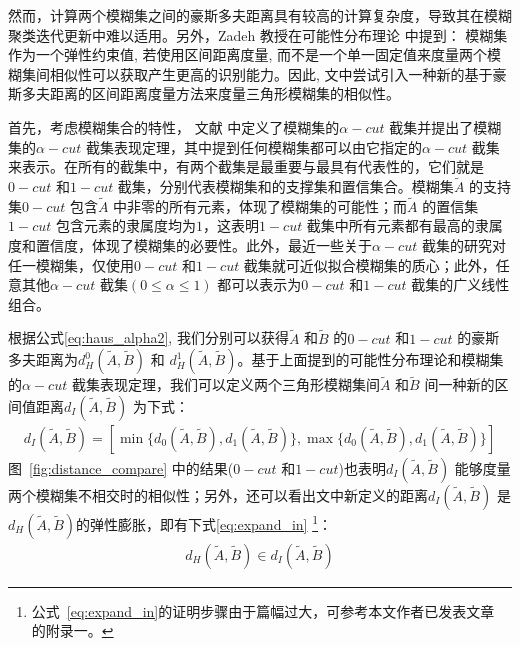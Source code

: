 然而，计算两个模糊集之间的豪斯多夫距离具有较高的计算复杂度，导致其在模糊聚类迭代更新中难以适用。另外，Zadeh 教授在可能性分布理论\cite{zadeh1978fuzzy} 中提到： 模糊集作为一个弹性约束值, 若使用区间距离度量, 而不是一个单一固定值来度量两个模糊集间相似性可以获取产生更高的识别能力。因此, 文中尝试引入一种新的基于豪斯多夫距离的区间距离度量方法来度量三角形模糊集的相似性。

首先，考虑模糊集合的特性， 文献 \cite{zadeh1978fuzzy} 中定义了模糊集的$\alpha-cut$ 截集并提出了模糊集的$\alpha-cut$ 截集表现定理，其中提到任何模糊集都可以由它指定的$\alpha-cut$ 截集来表示。在所有的截集中，有两个截集是最重要与最具有代表性的，它们就是$0-cut$ 和$1-cut$ 截集，分别代表模糊集和的支撑集和置信集合。模糊集$\tilde{A}$ 的支持集$0-cut$ 包含$\tilde{A}$ 中非零的所有元素，体现了模糊集的可能性；而$\tilde{A}$ 的置信集$1-cut$ 包含元素的隶属度均为$1$，这表明$1-cut$ 截集中所有元素都有最高的隶属度和置信度，体现了模糊集的必要性。此外，最近一些关于$\alpha-cut$ 截集的研究对任一模糊集，仅使用$0-cut$ 和$1-cut$ 截集就可近似拟合模糊集的质心；此外，任意其他$\alpha -cut$ 截集$ (0 \leq \alpha \leq 1)$ 都可以表示为$0-cut$ 和$1-cut$ 截集的广义线性组合\cite{liu2008efficient}。

根据公式\ref{eq:haus_alpha2}, 我们分别可以获得$\tilde{A}$ 和$\tilde{B}$ 的$0-cut$ 和$1-cut$ 的豪斯多夫距离为$d_H^{0} (\tilde{A}, \tilde{B})$ 和 $d_H^{1} (\tilde{A}, \tilde{B})$。基于上面提到的可能性分布理论和模糊集的$\alpha-cut$ 截集表现定理，我们可以定义两个三角形模糊集间$\tilde{A}$ 和$\tilde{B}$ 间一种新的区间值距离$d_I (\tilde{A}, \tilde{B})$ 为下式：
\begin{equation}\label{eq:interval}
    \begin{split}
        d _{I} (\tilde{A},\tilde{B}) = [\min \lbrace d_0 (\tilde{A},\tilde{B}),d_1(\tilde{A},\tilde{B}) \rbrace, \max \lbrace d_0(\tilde{A},\tilde{B}), d_1 (\tilde{A},\tilde{B}) \rbrace ]
    \end{split}
\end{equation}
图~\ref{fig:distance_compare} 中的结果($0-cut$ 和$1-cut$)也表明$d _{I} (\tilde{A},\tilde{B})$ 能够度量两个模糊集不相交时的相似性；另外，还可以看出文中新定义的距离$ d _{I} (\tilde{A},\tilde{B})$ 是$ d _{H} (\tilde{A},\tilde{B})$的弹性膨胀，即有下式\ref{eq:expand_in} \footnote{公式~\ref{eq:expand_in}的证明步骤由于篇幅过大，可参考本文作者已发表文章\cite{jiang2018enhanced} 的附录一。}：
\begin{equation}\label{eq:expand_in}
    \begin{split}
        d _{H} (\tilde{A},\tilde{B}) \in d _{I} (\tilde{A},\tilde{B})
    \end{split}
\end{equation}



